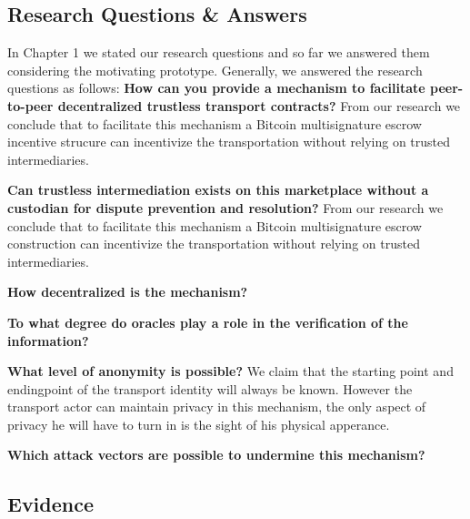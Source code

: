 \subsection{Research Questions \& Answers}

In Chapter 1 we stated our research questions and so far we answered them considering the motivating prototype. Generally, we answered the research questions as follows:
\bigbreak
\noindent \textbf{How can you provide a mechanism to facilitate peer-to-peer decentralized trustless transport contracts?} From our research we conclude that to facilitate this mechanism a Bitcoin multisignature escrow incentive strucure can incentivize the transportation without relying on trusted intermediaries.


\bigbreak
\noindent \textbf{Can trustless intermediation exists on this marketplace without a custodian for dispute prevention and resolution?} From our research we conclude that to facilitate this mechanism a Bitcoin multisignature escrow construction can incentivize the transportation without relying on trusted intermediaries.

\bigbreak
\noindent \textbf{How decentralized is the mechanism?}

\bigbreak
\noindent \textbf{To what degree do oracles play a role in the verification of the information?}

\bigbreak
\noindent \textbf{What level of anonymity is possible?} We claim that the starting point and endingpoint of the transport identity will always be known. However the transport actor can maintain privacy in this mechanism, the only aspect of privacy he will have to turn in is the sight of his physical apperance.

\bigbreak
\noindent \textbf{Which attack vectors are possible to undermine this mechanism?}


\subsection{Evidence}
